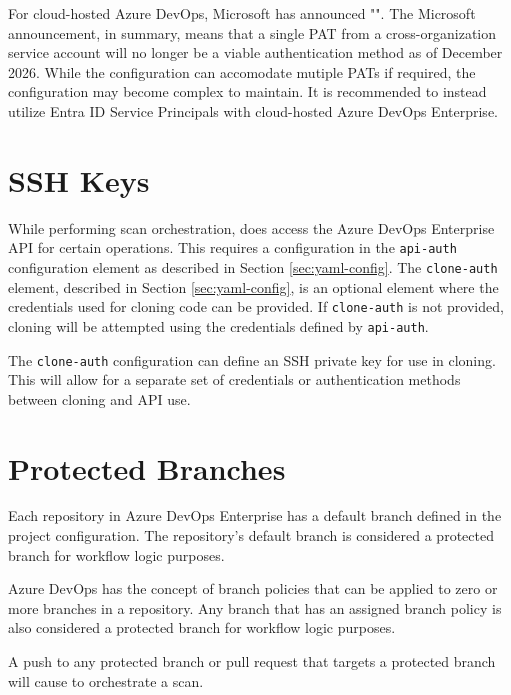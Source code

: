 For cloud-hosted Azure DevOps, Microsoft has announced
"".
The Microsoft announcement, in summary, means that a single PAT from a cross-organization service account will
no longer be a viable authentication method as of December 2026. While the \cxoneflow configuration can accomodate mutiple PATs if required,
the configuration may become complex to maintain. It is recommended to instead utilize Entra ID Service Principals with cloud-hosted
Azure DevOps Enterprise.

\section{\cxoneflowtext\space SSH Keys}

While performing scan orchestration, \cxoneflow does access the Azure DevOps Enterprise API for
certain operations.  This requires a configuration in the \texttt{api-auth} configuration
element as described in Section \ref{sec:yaml-config}.  The \texttt{clone-auth} element,
described in Section \ref{sec:yaml-config}, is an optional element where the credentials
used for cloning code can be provided.  If \texttt{clone-auth} is not provided, cloning will
be attempted using the credentials defined by \texttt{api-auth}.

The \texttt{clone-auth} configuration can define an SSH private key for use in cloning.  This
will allow for a separate set of credentials or authentication methods between cloning and
API use.

\section{Protected Branches}

Each repository in Azure DevOps Enterprise has a default branch defined in the project
configuration.  The repository's default branch is considered a protected branch for
workflow logic purposes.

Azure DevOps has the concept of branch policies that can be applied to zero or more
branches in a repository.  Any branch that has an assigned branch policy is also considered
a protected branch for workflow logic purposes.

A push to any protected branch or pull request that targets a protected branch will cause \cxoneflow to
orchestrate a scan.

